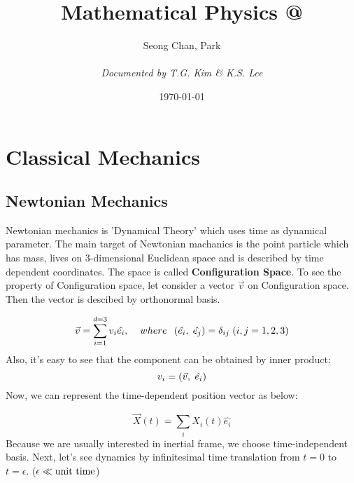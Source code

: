 \documentclass[final]{IEEEphot}
\makeatletter
\newcommand*{\rom}[1]{\expandafter\@slowromancap\romannumeral #1@} %
\newcommand{\IN}[2]{\left( #1 \Com #2 \right)} %
\newcommand\SM{\fontsize{8}{7.2}\selectfont}
\newcommand{\HS}{\hspace{0.3cm}} %
\newcommand{\Com}{,\hspace{0.1cm}} %
\newcommand{\hs}{\hspace{0.1cm}} %
\makeatother
\begin{document}
\title{Mathematical Physics \rom{2}}

\author{Seong Chan, Park \\
\vspace{0.5cm}
\SM \normalfont{\today} \\
\vspace{0.3cm}
\SM \textit{Documented by T.G. Kim \& K.S. Lee}}

\date{\today}

\maketitle

\tableofcontents

\newpage
\section{Classical Mechanics}

\subsection{Newtonian Mechanics}

\HS Newtonian mechanics is 'Dynamical Theory' which uses time as dynamical parameter. The main target of Newtonian machanics is the point particle which has mass, lives on 
3-dimensional Euclidean space and is described by time dependent coordinates. The space is called \textbf{Configuration Space}.
To see the property of Configuration space, let consider a vector $\vec{v}$ on Configuration space. Then the vector is descibed by orthonormal basis.

\begin{equation*}
 \vec{v} = \sum^{d=3}_{i=1} v_i \hat{e_i}\Com \HS where\hs\hs \IN{\hat{e_i}}{\hat{e_j}} = \delta_{ij}\hs (i,j = 1,2,3)
\end{equation*}
Also, it's easy to see that the component can be obtained by inner product:
\begin{equation*}
 v_i = \IN{\vec{v}}{\hat{e_i}}
\end{equation*}
Now, we can represent the time-dependent position vector as below:

\begin{equation*}
 \vec{X}(t) = \sum_{i} X_{i}(t) \hat{e_i}
\end{equation*}
Because we are usually interested in inertial frame, we choose time-independent basis. \linebreak 
Next, let's see dynamics by infinitesimal time translation from $t=0$ to $t=\epsilon$. ($\epsilon \ll \textnormal{unit time}$)
\end{document}
